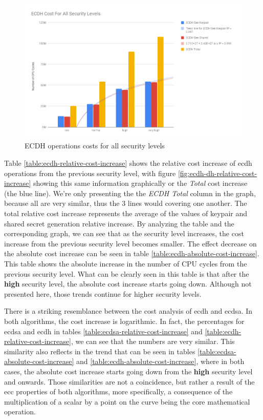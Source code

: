 \documentclass{llncs}
\begin{document}
\begin{figure}
  \centering
  \includegraphics[width=1.0\textwidth]{img/ecdh_cost_all_sls.png}
  \centering \caption{\label{fig:ecdh-costs-all-sls} ECDH operations costs for all security levels}
\end{figure}

Table \ref{table:ecdh-relative-cost-increase} shows the relative cost increase of \gls{ecdh} operations from the previous security
level, with figure \ref{fig:ecdh-dh-relative-cost-increase} showing this same information graphically or the \textit{Total} cost increase (the blue line).
We're only presenting the the \textit{ECDH Total} column in the graph, because all are very similar, thus the $3$ lines would covering one another.
The total relative cost increase represents the average of the values of keypair and shared secret generation relative increase.
By analyzing the table and the corresponding graph, we can see  that as the security level increases, the cost increase  from the previous security
level becomes smaller. The effect decrease on the absolute cost increase can be seen in table \ref{table:ecdh-absolute-cost-increase}.
This table shows the absolute increase in the number of CPU cycles from
the previous security level. What can be clearly seen in this table is that after the \textbf{high} security level, the absolute cost increase starts
going down. Although not presented here, those trends continue for higher security levels.

There is a striking resemblance between the cost analysis of \gls{ecdh} and \gls{ecdsa}. In both algorithms, the cost increase is logarithmic.
In fact, the percentages for \gls{ecdsa} and \gls{ecdh} in tables \ref{table:ecdsa-relative-cost-increase}
and \ref{table:ecdh-relative-cost-increase}, we can see that the numbers are very similar. This similarity also reflects in the
trend that can be seen in tables \ref{table:ecdsa-absolute-cost-increase} and \ref{table:ecdh-absolute-cost-increase}, where in both cases, the
absolute cost increase starts going down from the \textbf{high} security level and onwards. Those similarities are not a coincidence, but rather
a result of the \gls{ecc} properties of both algorithms, more specifically, a consequence of the multiplication of a scalar by a point on
the curve being the core mathematical operation.
\end{document}
